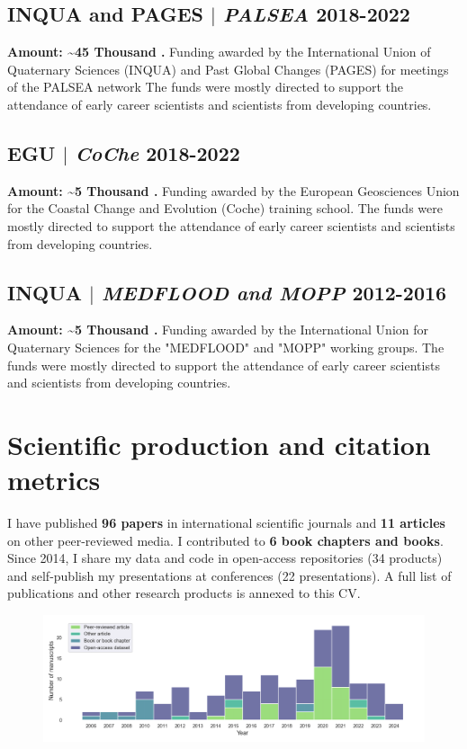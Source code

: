 \documentclass[11pt]{article}
\begin{document}
\subsection{INQUA and PAGES  $|$ {\normalfont\textit{PALSEA}} \hfill 2018-2022}
{\footnotesize \textbf{Amount: \textasciitilde 45 Thousand \texteuro.} Funding awarded by the International Union of Quaternary Sciences (INQUA) and Past Global Changes (PAGES) for meetings of the PALSEA network The funds were mostly directed to support the attendance of early career scientists and scientists from developing countries.}
\bigskip

\subsection{EGU  $|$ {\normalfont\textit{CoChe}} \hfill 2018-2022}
{\footnotesize \textbf{Amount: \textasciitilde 5 Thousand \texteuro.} Funding awarded by the European Geosciences Union for the Coastal Change and Evolution (Coche) training school. The funds were mostly directed to support the attendance of early career scientists and scientists from developing countries.}
\bigskip

\subsection{INQUA  $|$ {\normalfont\textit{MEDFLOOD and MOPP}} \hfill 2012-2016}
{\footnotesize \textbf{Amount: \textasciitilde 5 Thousand \texteuro.} Funding awarded by the International Union for Quaternary Sciences for the "MEDFLOOD" and "MOPP" working groups. The funds were mostly directed to support the attendance of early career scientists and scientists from developing countries.}
\bigskip


\newpage

\section{Scientific production and citation metrics}
\bigskip

{\normalfont I have published \textbf{96 papers} in international scientific journals and \textbf{11 articles} on other peer-reviewed media. I contributed to \textbf{6 book chapters and books}. Since 2014, I share my data and code in open-access repositories (34 products) and self-publish my presentations at conferences (22 presentations). A full list of publications and other research products is annexed to this CV.}

\begin{figure}[h]
\centering
\includegraphics[width=\textwidth]{img/products_per_year.png}
\end{figure}
\end{document}

